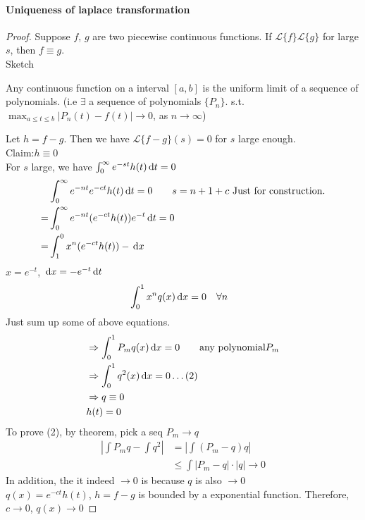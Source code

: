 \paragraph{Uniqueness of laplace transformation}
\begin{proof}
Suppose $f$, $g$ are two piecewise continuous functions. If $\mathscr{L}\{f\}\mathscr{L}\{g\}$ for large $s$, then $f\equiv g$.\\
Sketch\\
\begin{theorem}
Any continuous function on a interval $[a,b]$ is the uniform limit of a sequence of polynomials. (i.e $\exists$ a sequence of polynomials $\{P_n\}$. s.t. $\max_{a\leq t\leq b}|P_n(t)-f(t)|\rightarrow 0$, as $n\rightarrow\infty$)


\end{theorem}
Let $h=f-g$. Then we have $\mathscr{L}\{f-g\}(s)=0$ for $s$ large enough.\\
Claim:$h\equiv0$\\
For $s$ large, we have $\int_0^\infty e^{-st}h(t)\,\mathrm{d} t=0$\\
\[\begin{aligned}&\int_0^\infty e^{-nt}e^{-ct}h(t)\,\mathrm{d} t=0\qquad s=n+1+c\text{ Just for construction.}\\
=&\int_0^\infty e^{-nt}(e^{-ct}h(t))e^{-t}\,\mathrm{d} t=0\\
=&\int_1^0x^n(e^{-ct}h(t))-\,\mathrm{d} x\end{aligned}
\]
$x=e^{-t}$, $\,\mathrm{d} x=-e^{-t}\,\mathrm{d} t$
\[\begin{aligned}
&\int_0^1x^nq(x)\,\mathrm{d} x=0\quad \forall n
\end{aligned}\]
Just sum up some of above equations.
\[\begin{aligned}
&\Rightarrow \int_0^1P_mq(x)\,\mathrm{d} x=0\qquad \text{any polynomial} P_m\\
&\Rightarrow \int_0^1q^2(x)\,\mathrm{d} x=0\dots(2)\\
&\Rightarrow q\equiv 0\\
&h(t)=0
\end{aligned}
\]
To prove (2), by theorem, pick a seq $P_m\rightarrow q$\\
\[\begin{aligned}|\int P_mq-\int q^2|&=|\int(P_m-q)q|\\
&\leq\int|P_m-q|\cdot|q|\rightarrow0
\end{aligned}
\]
In addition, the it indeed $\rightarrow0$ is because $q$ is also $\rightarrow0$\\
$q(x)=e^{-ct}h(t)$, $h=f-g$ is bounded by a exponential function. Therefore, $c\rightarrow0$, $q(x)\rightarrow0$







\end{proof}






